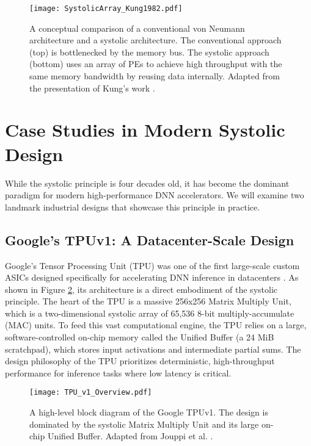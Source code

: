 \begin{figure}[htbp]
    \centering
    \texttt{[image: SystolicArray\_Kung1982.pdf]} 
    \caption[Conventional vs. Systolic Processing]{A conceptual comparison of a conventional von Neumann architecture and a systolic architecture. The conventional approach (top) is bottlenecked by the memory bus. The systolic approach (bottom) uses an array of PEs to achieve high throughput with the same memory bandwidth by reusing data internally. Adapted from the presentation of Kung's work \cite{kung1982systolic}.}
    \label{fig:conventional_vs_systolic}
\end{figure}

\section{Case Studies in Modern Systolic Design}
\label{sec:case_studies}
While the systolic principle is four decades old, it has become the dominant paradigm for modern high-performance DNN accelerators. We will examine two landmark industrial designs that showcase this principle in practice.

\subsection{Google's TPUv1: A Datacenter-Scale Design}
Google's Tensor Processing Unit (TPU) was one of the first large-scale custom ASICs designed specifically for accelerating DNN inference in datacenters \cite{jouppi2017tpu}. As shown in Figure \ref{fig:tpu_diagram}, its architecture is a direct embodiment of the systolic principle. The heart of the TPU is a massive 256x256 Matrix Multiply Unit, which is a two-dimensional systolic array of 65,536 8-bit multiply-accumulate (MAC) units. To feed this vast computational engine, the TPU relies on a large, software-controlled on-chip memory called the Unified Buffer (a 24 MiB scratchpad), which stores input activations and intermediate partial sums. The design philosophy of the TPU prioritizes deterministic, high-throughput performance for inference tasks where low latency is critical.

\begin{figure}[htbp]
    \centering
    \texttt{[image: TPU\_v1\_Overview.pdf]} 
    \caption[The Google TPUv1 Block Diagram]{A high-level block diagram of the Google TPUv1. The design is dominated by the systolic Matrix Multiply Unit and its large on-chip Unified Buffer. Adapted from Jouppi et al. \cite{jouppi2017tpu, mittal2021survey}.}
    \label{fig:tpu_diagram}
\end{figure}

